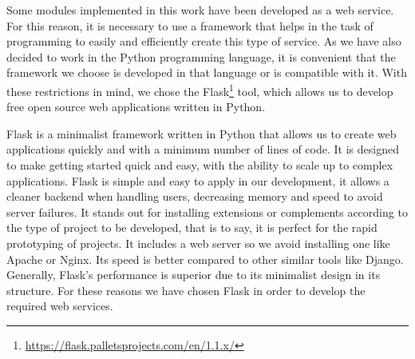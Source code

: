 Some modules implemented in this work have been developed as a web service. For this reason, it is necessary to use a framework that helps in the task of programming to easily and efficiently create this type of service. As we have also decided to work in the Python programming language, it is convenient that the framework we choose is developed in that language or is compatible with it. With these restrictions in mind, we chose the Flask\footnote{\url{https://flask.palletsprojects.com/en/1.1.x/}} tool, which allows us to develop free open source web applications written in Python.

Flask is a minimalist framework written in Python that allows us to create web applications quickly and with a minimum number of lines of code. It is designed to make getting started quick and easy, with the ability to scale up to complex applications. Flask is simple and easy to apply in our development, it allows a cleaner backend when handling users, decreasing memory and speed to avoid server failures. It stands out for installing extensions or complements according to the type of project to be developed, that is to say, it is perfect for the rapid prototyping of projects. It includes a web server so we avoid installing one like Apache or Nginx. Its speed is better compared to other similar tools like Django. Generally, Flask's performance is superior due to its minimalist design in its structure. For these reasons we have chosen Flask in order to develop the required web services.